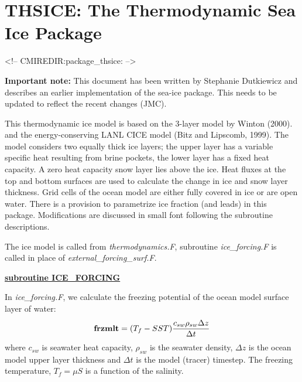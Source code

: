 


% 


\def\deg{$^o$}
\section{THSICE: The Thermodynamic Sea Ice Package}
\label{sec:pkg:thsice}
\begin{rawhtml}
<!-- CMIREDIR:package_thsice: -->
\end{rawhtml}

{\bf Important note:}
This document has been written by Stephanie Dutkiewicz
and describes an earlier implementation of the sea-ice package.
This needs to be updated to reflect the recent changes (JMC).

\noindent
This thermodynamic ice model is based on the 3-layer model by Winton (2000).
and the energy-conserving LANL CICE model (Bitz and Lipscomb, 1999).
The model considers two equally thick ice layers; the upper layer has
a variable specific heat resulting from brine pockets,
the lower layer has a fixed heat capacity. A zero heat capacity snow
layer lies above the ice. Heat fluxes at the top and bottom
surfaces are used to calculate the change in ice and snow layer
thickness. Grid cells of the ocean model are 
either fully covered in ice or are open water. There is
a provision to parametrize ice fraction (and leads) in this package.
Modifications are discussed in small font following the
subroutine descriptions.


\vspace{1cm}

\noindent
The ice model is called from {\it thermodynamics.F}, subroutine
{\it ice\_forcing.F} is called in place of {\it external\_forcing\_surf.F}.


\vspace{1cm}
\noindent
{\bf \underline{subroutine ICE\_FORCING}}

\noindent
In {\it ice\_forcing.F}, we calculate the freezing potential of the
ocean model surface layer of water:
\[
  {\bf frzmlt} = (T_f - SST) \frac{c_{sw} \rho_{sw} \Delta z}{\Delta t}
\]
where $c_{sw}$ is seawater heat capacity, 
$\rho_{sw}$ is the seawater density, $\Delta z$
is the ocean model upper layer thickness and $\Delta t$ is the model (tracer)
timestep. The freezing temperature, $T_f=\mu S$ is a function of the
salinity.



